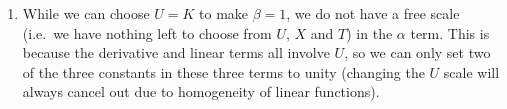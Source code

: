 \documentclass[a4paper, 12pt]{article}
\begin{document}
\begin{enumerate}[label={\bf \arabic{*}.\;}, ref={\arabic{*}},itemsep=3ex, left=0ex]
{\begin{enumerate}[label=(\alph*)]
\begin{equation}
          \end{equation}
          and to sort the $\pdd{\hat{u}}{\hat{x}}$ term we choose $T=L^2/D$. This gives
          \begin{equation}
            \pd{\hat{u}}{\hat{t}} = \pdd{\hat{u}}{\hat{x}} + \alpha \hat{u}( 1-\beta \hat{u} ),  \quad x \in [0,1],
          \end{equation}
          where
          \begin{equation}
            X=L, \quad T=\frac{L^2}{D}, \quad \alpha = \frac{rL^2}{D}, \quad \beta = \frac{U}{K}.
          \end{equation}
        \item While we can choose $U=K$ to make $\beta=1$, we do not have a free scale (i.e.\ we have nothing left to choose from $U$, $X$ and $T$) in the $\alpha$ term. This is because the derivative and linear terms all involve $U$, so we can only set two of the three constants in these three terms to unity (changing the $U$ scale will always cancel out due to homogeneity of linear functions).
      \end{enumerate}
    }



\end{enumerate}
\end{document}
